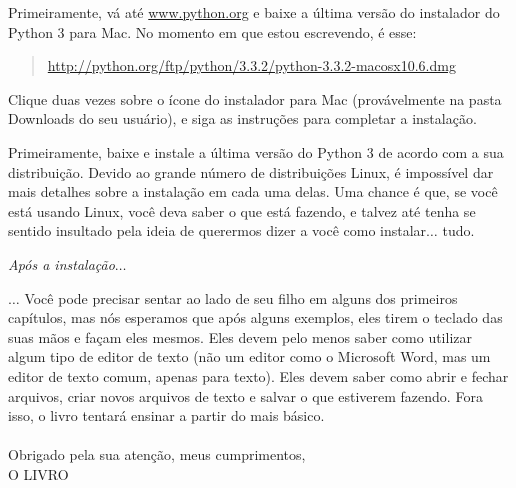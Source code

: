 \begin{MAC}

\noindent
Primeiramente, vá até \href{http://www.python.org}{www.python.org} e baixe a última versão do instalador do Python 3 para Mac. No momento em que estou escrevendo, é esse:
\begin{quote}
     \href{http://python.org/ftp/python/3.3.2/python-3.3.2-macosx10.6.dmg}{http://python.org/ftp/python/3.3.2/python-3.3.2-macosx10.6.dmg}
\end{quote}
Clique duas vezes sobre o ícone do instalador para Mac (provávelmente na pasta Downloads do seu usuário), e siga as instruções para completar a instalação.

\end{MAC}

\begin{LINUX}

\noindent
Primeiramente, baixe e instale a última versão do Python 3 de acordo com a sua distribuição. Devido ao grande número de distribuições Linux, é impossível dar mais detalhes sobre a instalação em cada uma delas. Uma chance é que, se você está usando Linux, você deva saber o que está fazendo, e talvez até tenha se sentido insultado pela ideia de querermos dizer a você como instalar$\ldots$ tudo.

\end{LINUX}

\noindent
\emph{\color{BrickRed}Após a instalação$\ldots$}

\noindent
$\ldots$
Você pode precisar sentar ao lado de seu filho em alguns dos primeiros capítulos, mas nós esperamos que após alguns exemplos, eles tirem o teclado das suas mãos e façam eles mesmos. Eles devem pelo menos saber como utilizar algum tipo de editor de texto (não um editor como o Microsoft Word, mas um editor de texto comum, apenas para texto). Eles devem saber como abrir e fechar arquivos, criar novos arquivos de texto e salvar o que estiverem fazendo. Fora isso, o livro tentará ensinar a partir do mais básico.
\\
\noindent\\
Obrigado pela sua atenção, meus cumprimentos,
\noindent\\
O LIVRO
